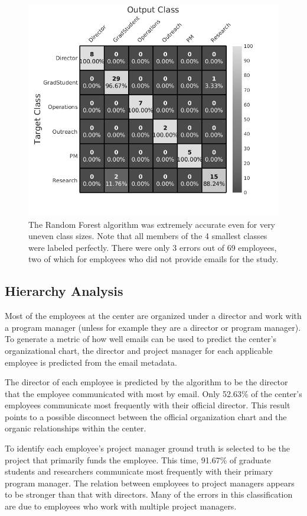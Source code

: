 \documentclass[10pt,twocolumn,conference]{IEEEtran}
\begin{document}
\begin{figure}[t]
    \centering
    \includegraphics[width=0.85\columnwidth,trim={1mm 8mm 10mm 0mm},clip]{Classification_confusion_BW}
    \vspace{-15pt}
    \caption{The Random Forest algorithm was extremely accurate even for very uneven class sizes.  Note that all members of the 4 smallest classes were labeled perfectly.  There were only 3 errors out of 69 employees, two of which for employees who did not provide emails for the study.}
    \vspace{-16pt}
    \label{fig:result_hist}
\end{figure}


\subsection{Hierarchy Analysis}
Most of the employees at the center are organized under a director and work with a program manager (unless for example they are a director or program manager).
To generate a metric of how well emails can be used to predict the center's organizational chart, the director and project manager for each applicable employee is predicted from the email metadata. 

The director of each employee is predicted by the algorithm to be the director that the employee communicated with most by email.
Only 52.63\% of the center's employees communicate most frequently with their official director.
This result points to a possible disconnect between the official organization chart and the organic relationships within the center.

To identify each employee's project manager ground truth is selected to be the project that primarily funds the employee.
This time, 91.67\% of graduate students and researchers communicate most frequently with their primary program manager.
The relation between employees to project managers appears to be stronger than that with directors.
Many of the errors in this classification are due to employees who work with multiple project managers.
\end{document}
